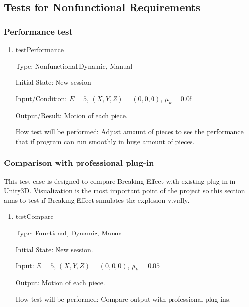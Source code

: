 \documentclass[12pt, titlepage]{article}
\begin{document}
\subsection{Tests for Nonfunctional Requirements}

\subsubsection{Performance test}

\begin{enumerate}

\item{testPerformance\\}

Type: Nonfunctional,Dynamic, Manual
					
Initial State: New session
					
Input/Condition: $E = 5$, $(X,Y,Z) = (0,0,0)$, $\mu_{k} = 0.05$
					
Output/Result: Motion of each piece.
					
How test will be performed: Adjust amount of pieces to see the performance that if program can run smoothly in huge amount of pieces.

\end{enumerate}

\subsubsection{Comparison with professional plug-in}

This test case is designed to compare Breaking Effect with existing plug-in in Unity3D. Visualization is the most important point of the project so this section aims to test if Breaking Effect simulates the explosion vividly. 

\begin{enumerate}
	
	\item{testCompare\\}
	
	Type: Functional, Dynamic, Manual
	
	Initial State: New session.
	
	Input: $E = 5$, $(X,Y,Z) = (0,0,0)$, $\mu_{k} = 0.05$ 
	
	Output: Motion of each piece.
	
	How test will be performed: Compare output with professional plug-ins. 
	
\end{enumerate}
\end{document}
